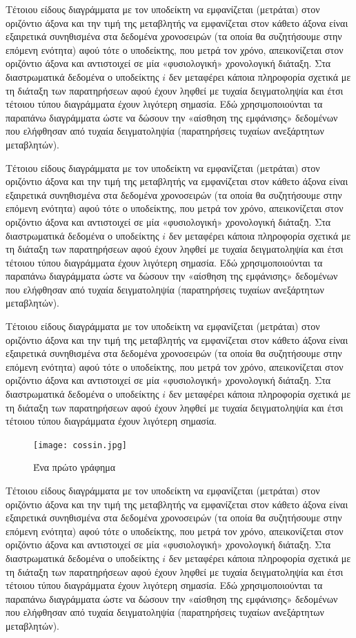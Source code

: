 \documentclass[12pt,a4paper,oneside]{book}
\begin{document}
Τέτοιου είδους διαγράμματα με τον υποδείκτη να εμφανίζεται (μετράται) στον οριζόντιο άξονα και την τιμή της μεταβλητής να εμφανίζεται στον κάθετο άξονα είναι εξαιρετικά συνηθισμένα στα δεδομένα χρονοσειρών (τα οποία θα συζητήσουμε στην επόμενη ενότητα) αφού τότε ο υποδείκτης, που μετρά τον χρόνο, απεικονίζεται στον οριζόντιο άξονα και αντιστοιχεί σε μία «φυσιολογική» χρονολογική διάταξη. Στα διαστρωματικά δεδομένα ο υποδείκτης $i$ δεν μεταφέρει κάποια πληροφορία σχετικά με τη διάταξη των παρατηρήσεων αφού έχουν ληφθεί με τυχαία δειγματοληψία και έτσι τέτοιου τύπου διαγράμματα έχουν λιγότερη σημασία. Εδώ χρησιμοποιούνται τα παραπάνω διαγράμματα ώστε να δώσουν την «αίσθηση της εμφάνισης» δεδομένων που ελήφθησαν από τυχαία δειγματοληψία (παρατηρήσεις τυχαίων ανεξάρτητων μεταβλητών).

Τέτοιου είδους διαγράμματα με τον υποδείκτη να εμφανίζεται (μετράται) στον οριζόντιο άξονα και την τιμή της μεταβλητής να εμφανίζεται στον κάθετο άξονα είναι εξαιρετικά συνηθισμένα στα δεδομένα χρονοσειρών (τα οποία θα συζητήσουμε στην επόμενη ενότητα) αφού τότε ο υποδείκτης, που μετρά τον χρόνο, απεικονίζεται στον οριζόντιο άξονα και αντιστοιχεί σε μία «φυσιολογική» χρονολογική διάταξη. Στα διαστρωματικά δεδομένα ο υποδείκτης $i$ δεν μεταφέρει κάποια πληροφορία σχετικά με τη διάταξη των παρατηρήσεων αφού έχουν ληφθεί με τυχαία δειγματοληψία και έτσι τέτοιου τύπου διαγράμματα έχουν λιγότερη σημασία. Εδώ χρησιμοποιούνται τα παραπάνω διαγράμματα ώστε να δώσουν την «αίσθηση της εμφάνισης» δεδομένων που ελήφθησαν από τυχαία δειγματοληψία (παρατηρήσεις τυχαίων ανεξάρτητων μεταβλητών).

Τέτοιου είδους διαγράμματα με τον υποδείκτη να εμφανίζεται (μετράται) στον οριζόντιο άξονα και την τιμή της μεταβλητής να εμφανίζεται στον κάθετο άξονα είναι εξαιρετικά συνηθισμένα στα δεδομένα χρονοσειρών (τα οποία θα συζητήσουμε στην επόμενη ενότητα) αφού τότε ο υποδείκτης, που μετρά τον χρόνο, απεικονίζεται στον οριζόντιο άξονα και αντιστοιχεί σε μία «φυσιολογική» χρονολογική διάταξη. Στα διαστρωματικά δεδομένα ο υποδείκτης $i$ δεν μεταφέρει κάποια πληροφορία σχετικά με τη διάταξη των παρατηρήσεων αφού έχουν ληφθεί με τυχαία δειγματοληψία και έτσι τέτοιου τύπου διαγράμματα έχουν λιγότερη σημασία.

\begin{figure}[!ht]
	\centering
	\texttt{[image: cossin.jpg]}
	\caption{Ένα πρώτο γράφημα}
	\label{graf1}
\end{figure}

Τέτοιου είδους διαγράμματα με τον υποδείκτη να εμφανίζεται (μετράται) στον οριζόντιο άξονα και την τιμή της μεταβλητής να εμφανίζεται στον κάθετο άξονα είναι εξαιρετικά συνηθισμένα στα δεδομένα χρονοσειρών (τα οποία θα συζητήσουμε στην επόμενη ενότητα) αφού τότε ο υποδείκτης, που μετρά τον χρόνο, απεικονίζεται στον οριζόντιο άξονα και αντιστοιχεί σε μία «φυσιολογική» χρονολογική διάταξη. Στα διαστρωματικά δεδομένα ο υποδείκτης $i$ δεν μεταφέρει κάποια πληροφορία σχετικά με τη διάταξη των παρατηρήσεων αφού έχουν ληφθεί με τυχαία δειγματοληψία και έτσι τέτοιου τύπου διαγράμματα έχουν λιγότερη σημασία. Εδώ χρησιμοποιούνται τα παραπάνω διαγράμματα ώστε να δώσουν την «αίσθηση της εμφάνισης» δεδομένων που ελήφθησαν από τυχαία δειγματοληψία (παρατηρήσεις τυχαίων ανεξάρτητων μεταβλητών).
\end{document}
